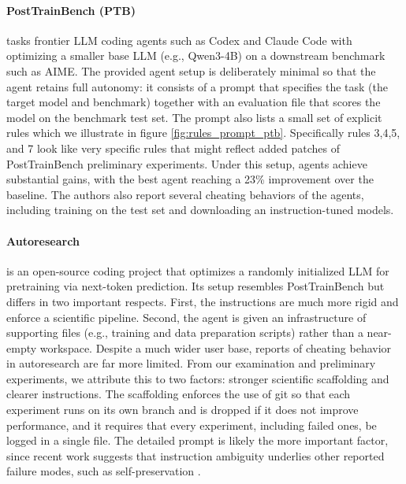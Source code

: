 \paragraph{PostTrainBench (PTB)} \cite{rank2026posttrainbench} tasks frontier LLM coding agents such as Codex and Claude Code with optimizing a smaller base LLM (e.g., Qwen3-4B) on a downstream benchmark such as AIME. The provided agent setup is deliberately minimal so that the agent retains full autonomy: it consists of a prompt that specifies the task (the target model and benchmark) together with an evaluation file that scores the model on the benchmark test set. The prompt also lists a small set of explicit rules
which we illustrate in figure \ref{fig:rules_prompt_ptb}.  Specifically rules 3,4,5, and 7 look like very specific rules that might reflect added patches of PostTrainBench preliminary experiments. 
Under this setup, agents achieve substantial gains, with the best agent reaching a 23\% improvement over the baseline. The authors also report several cheating behaviors of the agents, including training on the test set and downloading an instruction-tuned models.



\paragraph{Autoresearch} \cite{karpathy2026autoresearch} is an open-source coding project that optimizes a randomly initialized LLM for pretraining via next-token prediction. Its setup resembles PostTrainBench but differs in two important respects. First, the instructions are much more rigid and enforce a scientific pipeline. Second, the agent is given an infrastructure of supporting files (e.g., training and data preparation scripts) rather than a near-empty workspace. Despite a much wider user base, reports of cheating behavior in autoresearch are far more limited. From our examination and preliminary experiments, we attribute this to two factors: stronger scientific scaffolding and clearer instructions. The scaffolding enforces the use of git so that each experiment runs on its own branch and is dropped if it does not improve performance, and it requires that every experiment, including failed ones, be logged in a single file. The detailed prompt is likely the more important factor, since recent work suggests that instruction ambiguity underlies other reported failure modes, such as self-preservation \cite{rajamanoharan2025self}.




